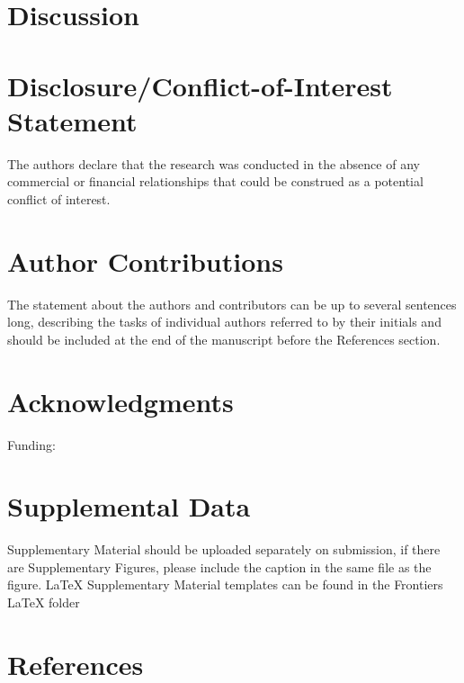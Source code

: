 \documentclass[utf8]{frontiersSCNS}
\begin{document}
\hypertarget{discussion}{%
\section{Discussion}\label{discussion}}

\hypertarget{disclosureconflict-of-interest-statement}{%
\section*{Disclosure/Conflict-of-Interest
Statement}\label{disclosureconflict-of-interest-statement}}

The authors declare that the research was conducted in the absence of
any commercial or financial relationships that could be construed as a
potential conflict of interest.

\hypertarget{author-contributions}{%
\section*{Author Contributions}\label{author-contributions}}

The statement about the authors and contributors can be up to several
sentences long, describing the tasks of individual authors referred to
by their initials and should be included at the end of the manuscript
before the References section.

\hypertarget{acknowledgments}{%
\section*{Acknowledgments}\label{acknowledgments}}

Funding:

\hypertarget{supplemental-data}{%
\section{Supplemental Data}\label{supplemental-data}}

Supplementary Material should be uploaded separately on submission, if
there are Supplementary Figures, please include the caption in the same
file as the figure. LaTeX Supplementary Material templates can be found
in the Frontiers LaTeX folder

\hypertarget{references}{%
\section{References}\label{references}}
\end{document}
